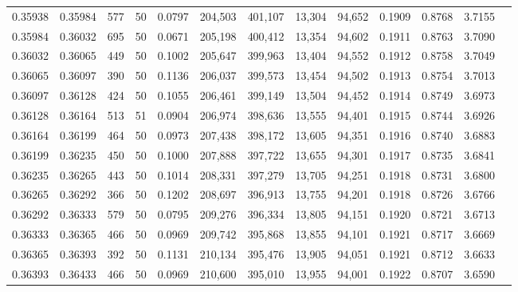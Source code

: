 \begin{tabular}{rrrrrrrrrrrrr}
0.35938 & 0.35984 &   577 &  50 &                                     0.0797 & 204,503 & 401,107 &  13,304 &  94,652 & 0.1909 & 0.8768 & 3.7155 \\
0.35984 & 0.36032 &   695 &  50 &                                     0.0671 & 205,198 & 400,412 &  13,354 &  94,602 & 0.1911 & 0.8763 & 3.7090 \\
0.36032 & 0.36065 &   449 &  50 &                                     0.1002 & 205,647 & 399,963 &  13,404 &  94,552 & 0.1912 & 0.8758 & 3.7049 \\
0.36065 & 0.36097 &   390 &  50 &                                     0.1136 & 206,037 & 399,573 &  13,454 &  94,502 & 0.1913 & 0.8754 & 3.7013 \\
0.36097 & 0.36128 &   424 &  50 &                                     0.1055 & 206,461 & 399,149 &  13,504 &  94,452 & 0.1914 & 0.8749 & 3.6973 \\
0.36128 & 0.36164 &   513 &  51 &                                     0.0904 & 206,974 & 398,636 &  13,555 &  94,401 & 0.1915 & 0.8744 & 3.6926 \\
0.36164 & 0.36199 &   464 &  50 &                                     0.0973 & 207,438 & 398,172 &  13,605 &  94,351 & 0.1916 & 0.8740 & 3.6883 \\
0.36199 & 0.36235 &   450 &  50 &                                     0.1000 & 207,888 & 397,722 &  13,655 &  94,301 & 0.1917 & 0.8735 & 3.6841 \\
0.36235 & 0.36265 &   443 &  50 &                                     0.1014 & 208,331 & 397,279 &  13,705 &  94,251 & 0.1918 & 0.8731 & 3.6800 \\
0.36265 & 0.36292 &   366 &  50 &                                     0.1202 & 208,697 & 396,913 &  13,755 &  94,201 & 0.1918 & 0.8726 & 3.6766 \\
0.36292 & 0.36333 &   579 &  50 &                                     0.0795 & 209,276 & 396,334 &  13,805 &  94,151 & 0.1920 & 0.8721 & 3.6713 \\
0.36333 & 0.36365 &   466 &  50 &                                     0.0969 & 209,742 & 395,868 &  13,855 &  94,101 & 0.1921 & 0.8717 & 3.6669 \\
0.36365 & 0.36393 &   392 &  50 &                                     0.1131 & 210,134 & 395,476 &  13,905 &  94,051 & 0.1921 & 0.8712 & 3.6633 \\
0.36393 & 0.36433 &   466 &  50 &                                     0.0969 & 210,600 & 395,010 &  13,955 &  94,001 & 0.1922 & 0.8707 & 3.6590 \\

\end{tabular}
